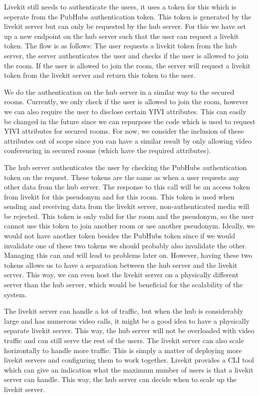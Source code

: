 \documentclass{report}
\begin{document}
Livekit still needs to authenticate the users, it uses a token for this which is seperate from the PubHubs
authentication token. This token is generated by the livekit server but can only be requested by the hub server.
For this we have set up a new endpoint on the hub server such that the user can request a livekit token. The flow is
as follows: The user requests a livekit token from the hub server, the server authenticates the user and checks if
the user is allowed to join the room. If the user is allowed to join the room, the server will request a livekit
token from the livekit server and return this token to the user.

We do the authentication on the hub server in a similar way to the secured rooms. Currently, we only check if
the user is allowed to join the room, however we can also require the user to disclose
certain YIVI attributes. This can easily be changed in the future since we can repurpose the code which is used to
request YIVI attributes for secured rooms. For now, we consider the inclusion of these attributes out of scope since
you can have a similar result by only allowing video conferencing in secured rooms (which have the required
attributes).

The hub server authenticates the user by checking the PubHubs authentication token on the request. These tokens are
the same as when a user requests any other data from the hub server. The response to this call will be an
access token from livekit for this pseudonym and for this room. This token is used when sending and receiving data
from the livekit server, non-authenticated media will be rejected. This token is only valid for the room and the
pseudonym, so the user cannot use this token to join another room or use another pseudonym. Ideally, we would not
have another token besides the PubHubs token since if we would invalidate one of these two tokens we should probably
also invalidate the other. Managing this can and will lead to problems later on. However, having these two tokens
allows us to have a separation between the hub server and the livekit server. This way, we can even host the livekit
server on a physically different server than the hub server, which would be beneficial for the scalability of the
system.

The livekit server can handle a lot of traffic, but when the hub is considerably large and has numerous video calls, it
might be a good idea to have a physically separate livekit server. This way, the hub server will not be overloaded with
video traffic and can still serve the rest of the users. The livekit server can also scale horizontally to handle
more traffic. This is simply a matter of deploying more livekit servers and configuring them to work together.
Livekit provides a CLI tool which can give an indication what the maximum number of users is that a livekit server
can handle. This way, the hub server can decide when to scale up the livekit server.
\end{document}
